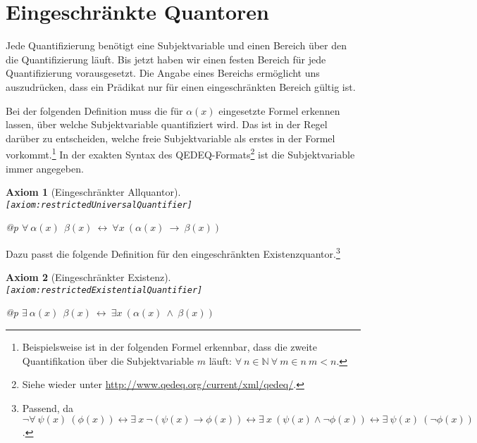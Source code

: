 \documentclass[a4paper,german,10pt,twoside]{book}
\newtheorem{ax}{Axiom}
\theoremstyle{definition}
\theoremstyle{remark}
\begin{document}
\section{Eingeschr{\"a}nkte Quantoren} \label{chapter7_section2} \hypertarget{chapter7_section2}{}
Jede Quantifizierung ben{\"o}tigt eine Subjektvariable und einen Bereich {\"u}ber den die Quantifizierung l{\"a}uft. Bis jetzt haben wir einen festen Bereich f{\"u}r jede Quantifizierung vorausgesetzt. Die Angabe eines Bereichs erm{\"o}glicht uns auszudr{\"u}cken, dass ein Pr{\"a}dikat nur f{\"u}r einen eingeschr{\"a}nkten Bereich g{\"u}ltig ist.

\par
Bei der folgenden Definition muss die f{\"u}r $\alpha(x)$ eingesetzte Formel {\glqq erkennen lassen\grqq}, {\"u}ber welche Subjektvariable quantifiziert wird. Das ist in der Regel dar{\"u}ber zu entscheiden, welche freie Subjektvariable als erstes in der Formel vorkommt.\footnote{Beispielsweise ist in der folgenden Formel erkennbar, dass die zweite Quantifikation {\"u}ber die Subjektvariable $m$ l{\"a}uft: $\forall \ n \in \mathbb{N} \ \forall \ m \in n \ m < n $.} In der exakten Syntax des QEDEQ-Formats\footnote{Siehe wieder unter \url{http://www.qedeq.org/current/xml/qedeq/}.} ist die Subjektvariable immer angegeben.

\begin{ax}[Eingeschr{\"a}nkter Allquantor]
\label{axiom:restrictedUniversalQuantifier} \hypertarget{axiom:restrictedUniversalQuantifier}{}
{\tt \tiny [\verb]axiom:restrictedUniversalQuantifier]]}
\mbox{}
\begin{longtable}{{@{\extracolsep{\fill}}p{\linewidth}}}
\centering $\forall \ \alpha(x)\ \ \beta(x)\ \leftrightarrow\ \forall x\ (\alpha(x)\ \rightarrow\ \beta(x))$
\end{longtable}

\end{ax}


\par
Dazu passt die folgende Definition f{\"u}r den eingeschr{\"a}nkten Existenzquantor.\footnote{Passend, da $\neg \forall \ \psi(x) \ (\phi(x)) \leftrightarrow \exists \ x \ \neg (\psi(x) \rightarrow \phi(x)) \leftrightarrow \exists \ x \ (\psi(x) \land \neg\phi(x)) \leftrightarrow \exists \ \psi(x) \ (\neg\phi(x))$.}

\begin{ax}[Eingeschr{\"a}nkter Existenz]
\label{axiom:restrictedExistentialQuantifier} \hypertarget{axiom:restrictedExistentialQuantifier}{}
{\tt \tiny [\verb]axiom:restrictedExistentialQuantifier]]}
\mbox{}
\begin{longtable}{{@{\extracolsep{\fill}}p{\linewidth}}}
\centering $\exists \ \alpha(x)\ \ \beta(x)\ \leftrightarrow\ \exists x\ (\alpha(x)\ \land\ \beta(x))$
\end{longtable}

\end{ax}
\end{document}
